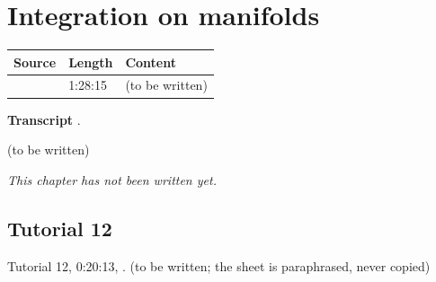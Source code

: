 \chapter{Integration on manifolds}\label{ch:c12}
\begin{paracol}{2}

\begin{sources}
\begin{tabularx}{\linewidth}{@{}l l L@{}}
\toprule
\textbf{Source} & \textbf{Length} & \textbf{Content}\\
\midrule
{} & 1:28:15 & (to be written)\\
\bottomrule
\end{tabularx}

\smallskip
\textbf{Transcript} .
\end{sources}

\begin{reading}
(to be written)
\end{reading}

\emph{This chapter has not been written yet.}

\section{Tutorial 12}\label{sec:t12-1}
Tutorial 12, 0:20:13, . (to be written; the sheet is paraphrased, never copied)

\flushside
\end{paracol}
